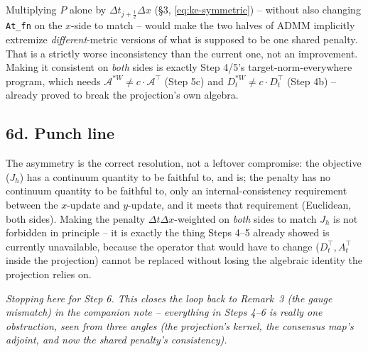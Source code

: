 \documentclass[11pt]{article}
\newcommand{\dt}{\Delta t}
\newcommand{\dx}{\Delta x}
\newcommand{\code}[1]{\texttt{#1}}
\newcommand{\half}{\tfrac12}
\begin{document}
Multiplying $P$ alone by $\dt_{j+\half}\dx$ (\S3, \eqref{eq:ke-symmetric}) -- without also changing
\code{At\_fn} on the $x$-side to match -- would make the two halves of ADMM implicitly extremize
\emph{different}-metric versions of what is supposed to be one shared penalty. That is a strictly
worse inconsistency than the current one, not an improvement. Making it consistent on \emph{both}
sides is exactly Step 4/5's target-norm-everywhere program, which needs $\mathcal{A}^{*W}\neq
c\cdot\mathcal{A}^\top$ (Step 5c) and $D_t^{*W}\neq c\cdot D_t^\top$ (Step 4b) -- already proved to
break the projection's own algebra.

\subsection*{6d. Punch line}

The asymmetry is the correct resolution, not a leftover compromise: the objective ($J_h$) has a
continuum quantity to be faithful to, and is; the penalty has no continuum quantity to be faithful
to, only an internal-consistency requirement between the $x$-update and $y$-update, and it meets
that requirement (Euclidean, both sides). Making the penalty $\dt\dx$-weighted on \emph{both} sides
to match $J_h$ is not forbidden in principle -- it is exactly the thing Steps 4--5 already showed
is currently unavailable, because the operator that would have to change ($D_t^\top,A_t^\top$
inside the projection) cannot be replaced without losing the algebraic identity the projection
relies on.

\bigskip
\noindent\emph{Stopping here for Step 6. This closes the loop back to Remark~3
(the gauge mismatch) in the companion note -- everything in Steps 4--6 is really one obstruction,
seen from three angles (the projection's kernel, the consensus map's adjoint, and now the shared
penalty's consistency).}
\end{document}
